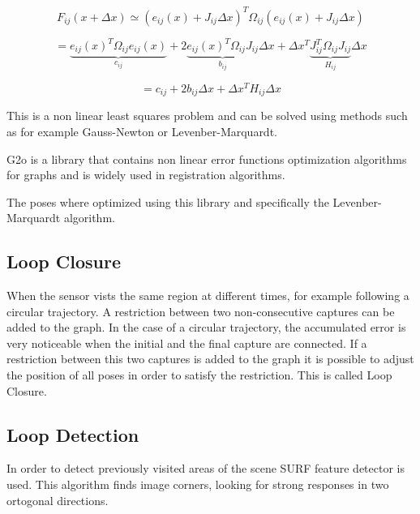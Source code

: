 \begin{equation}
\label{eq:globalFuncAprox}
F_{ij}(x + \Delta x) \simeq (e_{ij}(x) + J_{ij} \Delta x)^T \Omega_{ij}  (e_{ij}(x) + J_{ij} \Delta x)
\end{equation}

\begin{equation}
\label{eq:globalFuncAprox2}
 =  \underbrace{e_{ij}(x)^T \Omega_{ij} e_{ij}(x)}_{c_{ij}} + 2  \underbrace{e_{ij}(x)^T \Omega_{ij} J_{ij}}_{b_{ij}} \Delta x + \Delta x^T \underbrace{ J_{ij}^T  \Omega_{ij} J_{ij}}_{H_{ij}} \Delta x
\end{equation}

\begin{equation}
\label{eq:globalFuncAprox2}
 = c_{ij} + 2 b_{ij} \Delta x + \Delta x^T H_{ij} \Delta x
\end{equation}

This is a non linear least squares problem and can be solved using 
methods such as for example Gauss-Newton or Levenber-Marquardt.





G2o is a library that contains non linear error functions optimization 
algorithms for graphs and is widely used in registration algorithms. 

The poses where optimized using this library and specifically the 
Levenber-Marquardt algorithm.



\subsection{Loop Closure}

When the sensor vists the same region at different times, for example following 
a circular trajectory. A restriction between two non-consecutive captures can be 
added to the graph. In the case of a circular trajectory, the accumulated error 
is very noticeable when the initial and the final capture are connected. If a 
restriction between this two captures is added to the graph it is possible to 
adjust the position of all poses in order to satisfy the restriction. This 
is called Loop Closure.



\subsection{Loop Detection}

In order to detect previously visited areas of the scene SURF \cite{Bay06surf} feature detector 
is used. This algorithm finds image corners, looking for strong responses in two ortogonal directions. 


